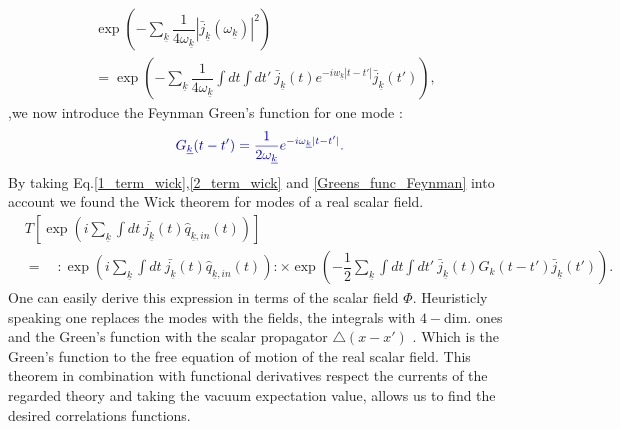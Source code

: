 \documentclass[12pt, titlepage]{article}
\begin{document}
\begin{equation}\label{2_term_wick}
\begin{split}
  &\exp
    \left(
       -
    \sum_{\underline{k}}
     	\dfrac{1}{4\omega_{\underline{k}}}
    	| \bar{j}_{\underline{k}}(\omega_{\underline{k}})|^2
    \right)	
 \\
 &=
      \exp
    \left(
       -
    \sum_{\underline{k}}
     	\dfrac{1}{4\omega_{\underline{k}}}
     	\int dt
		\!     	
     	\int dt'
     	\
     \bar{j}_{\underline{k}}(t)
     e^{-iw_{\underline{k}}|t-t'|} 
	          \bar{j}_{\underline{k}}(t')
    \right)	
    ,
\end{split}
\end{equation}
,we now introduce the Feynman Green's function for one mode :
\begin{equation}\label{Greens_func_Feynman}
 \textcolor[RGB]{0,0,204}{
 G_{\underline{k}}(t-t')=\dfrac{1}{2\omega_{\underline{k}}} e^{-i\omega_{\underline{k}} |t-t'|}
 .
}
\end{equation}
By taking Eq.\enskip\eqref{1_term_wick},\eqref{2_term_wick} and \eqref{Greens_func_Feynman} into account we found the Wick theorem for modes of a real scalar field.
\begin{equation}\label{Wick_theorem_scalar_modes}
\begin{split}
	& T\left[
    \exp
    \left(
    i
    \sum_{\underline{k}}\int dt \ \bar{j_{\underline{k}}}(t) \hat{q}_{\underline{k},in}(t) 
    \right)
    \right]  
    \\
    &=
    \quad
:
\exp
    \left(
    i
    \sum_{\underline{k}}\int dt \ \bar{j_{\underline{k}}}(t) \hat{q}_{\underline{k},in}(t) 
    \right)
    :  \times
          \exp
    \left(
       -
            	\dfrac{1}{2}
    \sum_{\underline{k}}
     	\int dt
		\!     	
     	\int dt'
     	\
     \bar{j}_{\underline{k}}(t)
     G_{k}(t-t')
	          \bar{j}_{\underline{k}}(t')
    \right)	
 .
\end{split}
\end{equation}
One can easily derive this expression in terms of the scalar field $ \Phi $. Heuristicly speaking one replaces the modes with the fields, the integrals with $  4-$dim. ones and the Green's function with the scalar propagator $ \triangle(x-x')$ . Which is the Green's function to the free equation of motion of the real scalar field.
This theorem in combination with functional derivatives respect the currents of the regarded theory and taking the vacuum expectation value, allows us to find the desired correlations functions.
\end{document}
